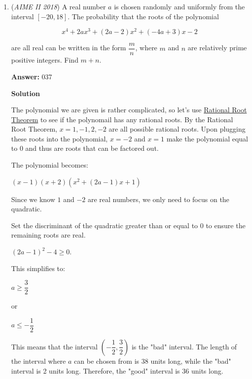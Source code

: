 \begin{enumerate}
Multiplying $xy \cdot yz \cdot zx = (xyz)^2$ we obtain $60 \cdot 960(16+30i)$ (too lazy to do $60 \cdot 960$, you don't need to). Taking the square root, we get $240\sqrt{16+30i}$. Letting $(a+bi)^2=16+30i,$ we have $a^2+2abi-b^2=16+30i.$ Thus, $(a+b)(a-b)=16,$ and $2ab=30.$ Guessing and checking, we get $a+bi=5+3i$. Therefore, $xyz=240(5+3i).$ Dividing this by each of the equations provided in the original problem, we get $x=20+12i,y=-10-10i,$ and $z=-3+3i$. $20+12i-10-10i-3+3i=7+5i$. Finally, $7^2+5^2=\boxed{074}.$



	\item (\textit{AIME II 2018}) A real number $a$ is chosen randomly and uniformly from the interval $[-20, 18]$. The probability that the roots of the polynomial


 
 \[x^4 + 2ax^3 + (2a - 2)x^2 + (-4a + 3)x - 2\]


 are all real can be written in the form $\dfrac{m}{n}$, where $m$ and $n$ are relatively prime positive integers. Find $m + n$.


 
 \textbf{Answer: }037



\textbf{Solution}

The polynomial we are given is rather complicated, so let's use \href{https://artofproblemsolving.com/wiki/index.php?title=Rational\_Root\_Theorem}{Rational Root Theorem} to see if the polynomail has any rational roots. By the Rational Root Theorem, $x = 1, -1, 2, -2$ are all possible rational roots. Upon plugging these roots into the polynomial, $x = -2$ and $x = 1$ make the polynomial equal to 0 and thus are roots that can be factored out.

 The polynomial becomes:

 $(x - 1)(x + 2)(x^2 + (2a - 1)x + 1)$

 Since we know $1$ and $-2$ are real numbers, we only need to focus on the quadratic.

 Set the discriminant of the quadratic greater than or equal to 0 to ensure the remaining roots are real.

 $(2a - 1)^2 - 4 \geq 0$.

 This simplifies to:

 $a \geq \dfrac{3}{2}$

 or

 $a \leq -\dfrac{1}{2}$

 This means that the interval $\left(-\dfrac{1}{2}, \dfrac{3}{2}\right)$ is the "bad" interval. The length of the interval where $a$ can be chosen from is 38 units long, while the "bad" interval is 2 units long. Therefore, the "good" interval is 36 units long.


\end{enumerate}
